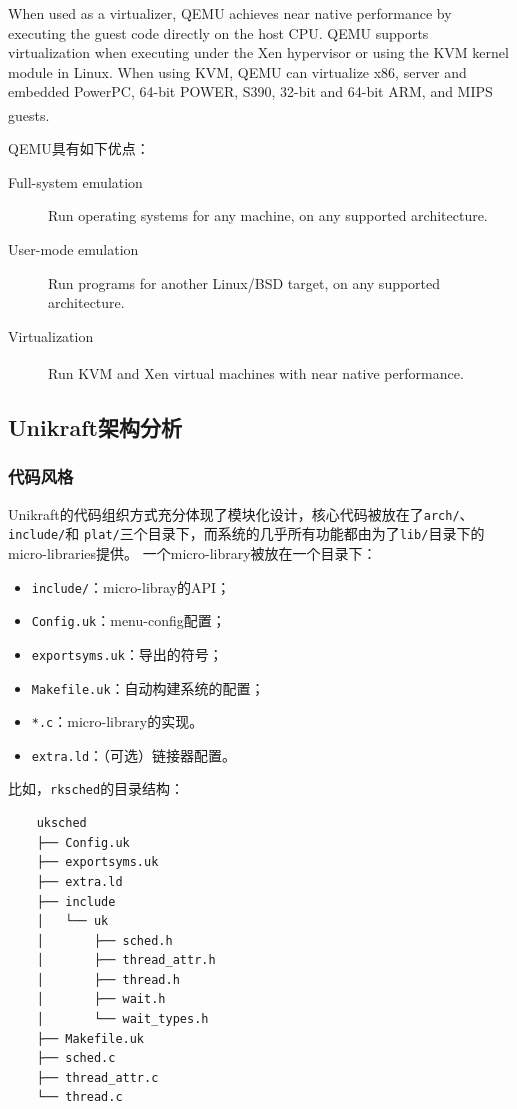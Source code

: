 \documentclass[UTF8,fontset=none,linespread=1.15]{ctexart}
\let\nosupcite\cite
\renewcommand*{\cite}[1]{\textsuperscript{\nosupcite{#1}}}
\begin{document}
When used as a virtualizer, QEMU achieves near native performance by executing the guest code directly on the host CPU. QEMU supports virtualization when executing under the Xen hypervisor or using the KVM kernel module in Linux. When using KVM, QEMU can virtualize x86, server and embedded PowerPC, 64-bit POWER, S390, 32-bit and 64-bit ARM, and MIPS guests.\cite{1}

\noindent QEMU具有如下优点：

\begin{description}
\item[Full-system emulation] Run operating systems for any machine, on any supported architecture.
\item[User-mode emulation] Run programs for another Linux/BSD target, on any supported architecture.
\item[Virtualization] Run KVM and Xen virtual machines with near native performance.\cite{1}
\end{description}

\subsection{Unikraft架构分析}
\subsubsection{代码风格}
Unikraft的代码组织方式充分体现了模块化设计，核心代码被放在了\texttt{arch/}、\texttt{include/}和
\texttt{plat/}三个目录下，而系统的几乎所有功能都由为了\texttt{lib/}目录下的micro-libraries提供。
一个micro-library被放在一个目录下：
\begin{itemize}
\item \texttt{include/}：micro-libray的API；
\item \texttt{Config.uk}：menu-config配置；
\item \texttt{exportsyms.uk}：导出的符号；
\item \texttt{Makefile.uk}：自动构建系统的配置；
\item \texttt{*.c}：micro-library的实现。
\item \texttt{extra.ld}：（可选）链接器配置。
\end{itemize}

比如，\texttt{rksched}的目录结构：
{\linespread{1}
\begin{verbatim}
    uksched
    ├── Config.uk
    ├── exportsyms.uk
    ├── extra.ld
    ├── include
    │   └── uk
    │       ├── sched.h
    │       ├── thread_attr.h
    │       ├── thread.h
    │       ├── wait.h
    │       └── wait_types.h
    ├── Makefile.uk
    ├── sched.c
    ├── thread_attr.c
    └── thread.c
\end{verbatim}}
\end{document}
